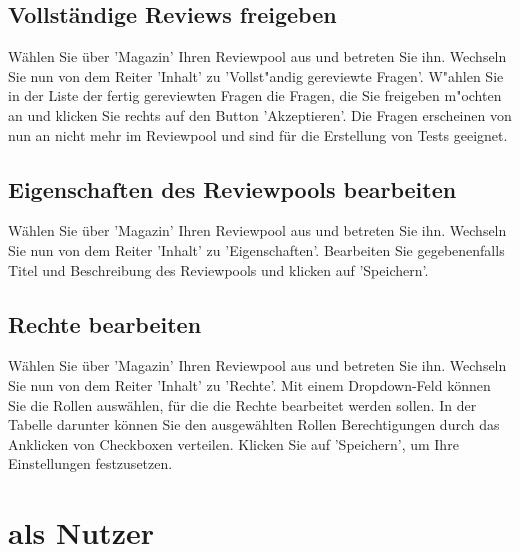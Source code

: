\documentclass[12pt,a4paper]{scrreprt}
\begin{document}
\subsection{Vollständige Reviews freigeben}
Wählen Sie über 'Magazin' Ihren Reviewpool aus und betreten Sie ihn. Wechseln Sie nun von dem Reiter 'Inhalt' zu 'Vollst"andig gereviewte Fragen'. W"ahlen Sie in der Liste der fertig gereviewten Fragen die Fragen, die Sie freigeben m"ochten an und klicken Sie rechts auf den Button 'Akzeptieren'. Die Fragen erscheinen von nun an nicht mehr im Reviewpool und sind für die Erstellung von Tests geeignet.
		
\subsection{Eigenschaften des Reviewpools bearbeiten}
Wählen Sie über 'Magazin' Ihren Reviewpool aus und betreten Sie ihn. Wechseln Sie nun von dem Reiter 'Inhalt' zu 'Eigenschaften'. Bearbeiten Sie gegebenenfalls Titel und Beschreibung des Reviewpools und klicken auf 'Speichern'. 
		
\subsection{Rechte bearbeiten}
Wählen Sie über 'Magazin' Ihren Reviewpool aus und betreten Sie ihn. Wechseln Sie nun von dem Reiter 'Inhalt' zu 'Rechte'. Mit einem Dropdown-Feld können Sie die Rollen auswählen, für die die Rechte bearbeitet werden sollen. In der Tabelle darunter können Sie den ausgewählten Rollen Berechtigungen durch das Anklicken von Checkboxen verteilen. Klicken Sie auf 'Speichern', um Ihre Einstellungen festzusetzen. 
		
\section{als Nutzer}
	
\end{document}
